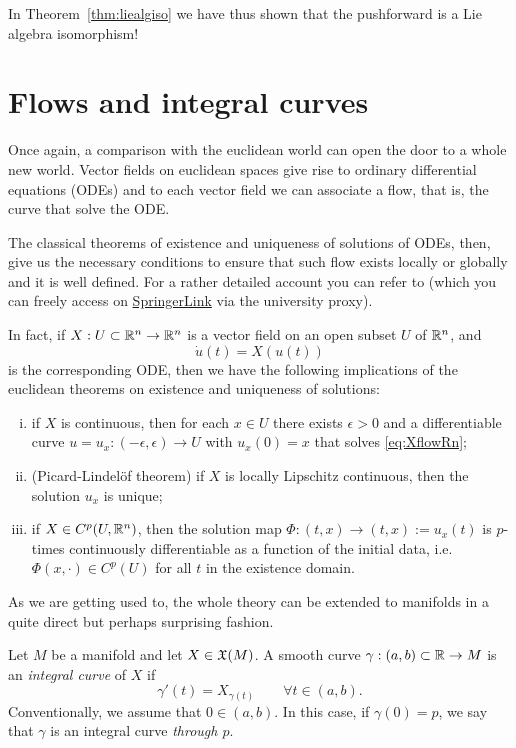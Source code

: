 In Theorem~\ref{thm:liealgiso} we have thus shown that the pushforward is a Lie algebra isomorphism!

\section{Flows and integral curves}

Once again, a comparison with the euclidean world can open the door to a whole new world.
Vector fields on euclidean spaces give rise to ordinary differential equations (ODEs) and to each vector field we can associate a flow, that is, the curve that solve the ODE.

The classical theorems of existence and uniqueness of solutions of ODEs, then, give us the necessary conditions to ensure that such flow exists locally or globally and it is well defined.
For a rather detailed account you can refer to \cite[Chapters 3.2 and 3.3]{book:knauf} (which you can freely access on \href{https://link.springer.com/book/10.1007\%2F978-3-662-55774-7}{SpringerLink} via the university proxy).

In fact, if $X: U\subset\mathbb{R}^n \to \mathbb{R}^n$ is a vector field on an open subset $U$ of $\mathbb{R}^n$, and
\begin{equation}\label{eq:XflowRn}
  \dot u(t) = X(u(t))
\end{equation}
is the corresponding ODE, then we have the following implications of the euclidean theorems on existence and uniqueness of solutions:
\begin{enumerate}[(i)]
  \item if $X$ is continuous, then for each $x\in U$ there exists $\epsilon > 0$ and a differentiable curve $u = u_{x} : (-\epsilon, \epsilon) \to U$ with $u_x(0) = x$ that solves \eqref{eq:XflowRn};
  \item (Picard-Lindel\"of theorem) if $X$ is locally Lipschitz continuous, then the solution $u_x$ is unique;
  \item if $X\in C^p(U,\mathbb{R}^n)$, then the solution map $\Phi : (t, x) \to (t, x) := u_x (t)$ is $p$-times continuously differentiable as a function of the initial data, i.e. $\Phi(x, \cdot)\in C^p(U)$ for all $t$ in the existence domain.
\end{enumerate}

As we are getting used to, the whole theory can be extended to manifolds in a quite direct but perhaps surprising fashion.

\begin{definition}
  Let $M$ be a manifold and let $X\in\mathfrak{X}(M)$.
  A smooth curve $\gamma: (a,b)\subset\mathbb{R} \to M$ is an \emph{integral curve} of $X$ if
  \begin{equation}\label{eq:integralCurve}
    \gamma'(t) = X_{\gamma(t)} \qquad \forall t\in(a,b).
  \end{equation}
  Conventionally, we assume that $0\in(a,b)$. In this case, if $\gamma(0)=p$, we say that $\gamma$ is an integral curve \emph{through $p$}.
\end{definition}

